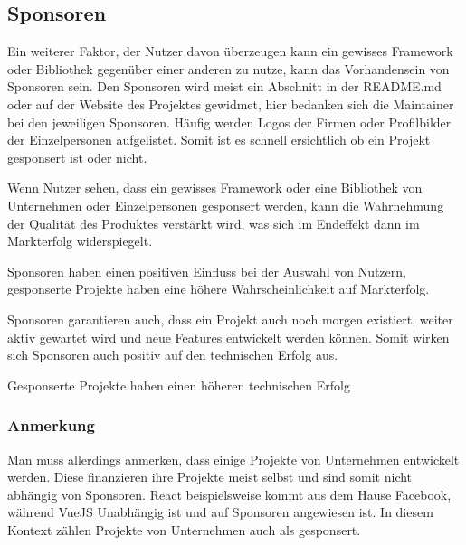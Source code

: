 \subsection{Sponsoren}

Ein weiterer Faktor, der Nutzer davon überzeugen kann ein gewisses Framework oder Bibliothek 
gegenüber einer anderen zu nutze, kann das Vorhandensein von Sponsoren sein. 
Den Sponsoren wird meist ein Abschnitt in der README.md oder auf der Website des Projektes
gewidmet, hier bedanken sich die Maintainer bei den jeweiligen Sponsoren. Häufig werden Logos
der Firmen oder Profilbilder der Einzelpersonen aufgelistet. Somit ist es schnell ersichtlich
ob ein Projekt gesponsert ist oder nicht. 

Wenn Nutzer sehen, dass ein gewisses Framework oder eine Bibliothek von Unternehmen oder 
Einzelpersonen gesponsert werden, kann die Wahrnehmung der Qualität 
des Produktes verstärkt wird, was sich im Endeffekt dann im Markterfolg widerspiegelt. %

\begin{hypothesis}
    Sponsoren haben einen positiven Einfluss bei der Auswahl von Nutzern, gesponserte Projekte haben
    eine höhere Wahrscheinlichkeit auf Markterfolg.
\end{hypothesis}

Sponsoren garantieren auch, dass ein Projekt auch noch morgen existiert, weiter aktiv gewartet wird
und neue Features entwickelt werden können. Somit wirken sich Sponsoren auch positiv auf den 
technischen Erfolg aus.

\begin{hypothesis}
    Gesponserte Projekte haben einen höheren technischen Erfolg
\end{hypothesis}

\subsubsection*{Anmerkung}
Man muss allerdings anmerken, dass einige Projekte von Unternehmen entwickelt werden. Diese finanzieren 
ihre Projekte meist selbst und sind somit nicht abhängig von Sponsoren. 
React beispielsweise kommt aus dem Hause Facebook, während VueJS Unabhängig ist und auf Sponsoren angewiesen ist.
In diesem Kontext zählen Projekte von Unternehmen auch als gesponsert.